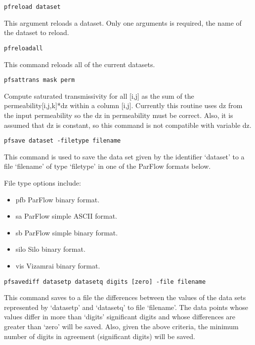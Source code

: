 \begin{description}
\item{\begin{verbatim}pfreload dataset\end{verbatim}}
This argument reloads a dataset. Only one arguments is required, the name of the dataset to reload.

\item{\begin{verbatim}pfreloadall\end{verbatim}}
This command reloads all of the current datasets.

\item{\begin{verbatim}pfsattrans mask perm\end{verbatim}}
Compute saturated transmissivity for all [i,j] as the sum of the
permeability[i,j,k]*dz within a column [i,j]. Currently this routine
uses dz from the input permeability so the dz in permeability must be correct.
Also, it is assumed that dz is constant, so this command is not compatible with variable dz.


\item{\begin{verbatim}pfsave dataset -filetype filename\end{verbatim}}
This command is used to save the data set given by the identifier
`dataset' to a file `filename' of type `filetype' in one of the
ParFlow formats below.

File type options include:
\begin{itemize}
\item{pfb}  ParFlow binary format.
\item{sa}  ParFlow simple ASCII format.
\item{sb}  ParFlow simple binary format.
\item{silo} Silo binary format.
\item{vis}  Vizamrai binary format.
\end{itemize}

\item{\begin{verbatim}pfsavediff datasetp datasetq digits [zero] -file filename
\end{verbatim}}
This command saves to a file the differences between the values
of the data sets represented by `datasetp' and `datasetq' to file
`filename'.  The data points whose values differ in more than
`digits' significant digits and whose differences are greater than
`zero' will be saved.  Also, given the above criteria, the
minimum number of digits in agreement (significant digits) will be
saved.


\end{description}
